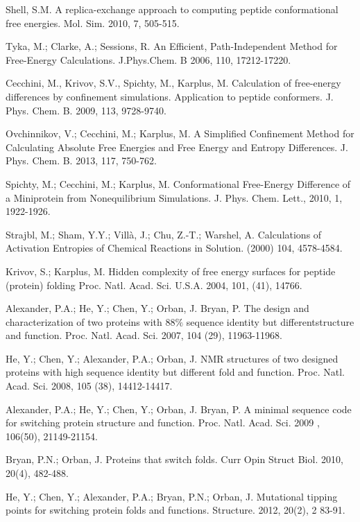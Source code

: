 \documentclass[12pt]{article}
\begin{document}
\begin{thebibliography}{99}
Shell, S.M. A replica-exchange approach to computing peptide conformational free energies. Mol. Sim. 2010, 7, 505-515.

Tyka, M.; Clarke, A.; Sessions, R. An Efficient, Path-Independent Method for Free-Energy Calculations. J.Phys.Chem. B 2006, 110, 17212-17220.

Cecchini, M., Krivov, S.V., Spichty, M., Karplus, M. Calculation of free-energy differences by confinement simulations. Application to peptide conformers. J. Phys. Chem. B. 2009, 113, 9728-9740.

Ovchinnikov, V.; Cecchini, M.; Karplus, M. A Simplified Confinement Method for Calculating Absolute Free Energies
and Free Energy and Entropy Differences. J. Phys. Chem. B. 2013, 117, 750-762.

Spichty, M.; Cecchini, M.; Karplus, M. Conformational Free-Energy Difference of a Miniprotein from Nonequilibrium
Simulations. J. Phys. Chem. Lett., 2010, 1, 1922-1926.

Strajbl, M.; Sham, Y.Y.; Villà, J.; Chu, Z.-T.; Warshel, A. Calculations of Activation Entropies of Chemical Reactions
in Solution. (2000) 104, 4578-4584.

Krivov, S.; Karplus, M. Hidden complexity of free energy surfaces for peptide (protein) folding Proc. Natl. Acad. Sci. U.S.A. 2004, 101, (41), 14766.

Alexander, P.A.; He, Y.; Chen, Y.; Orban, J. Bryan, P. The design and characterization of two proteins with $88 \%$ sequence identity but differentstructure and function. Proc. Natl. Acad. Sci. 2007, 104 (29), 11963-11968.

He, Y.; Chen, Y.; Alexander, P.A.; Orban, J. NMR structures of two designed proteins with high sequence identity but different fold and function. Proc. Natl. Acad. Sci. 2008, 105 (38), 14412-14417.

Alexander, P.A.; He, Y.; Chen, Y.; Orban, J. Bryan, P. A minimal sequence code for switching protein structure and function. Proc. Natl. Acad. Sci. 2009
, 106(50), 21149-21154.

Bryan, P.N.; Orban, J. Proteins that switch folds. Curr Opin Struct Biol. 2010, 20(4), 482-488.

He, Y.; Chen, Y.; Alexander, P.A.; Bryan, P.N.; Orban, J. Mutational tipping points for switching protein folds and functions. Structure. 2012, 20(2), 2
83-91.


\end{thebibliography}
\end{document}
